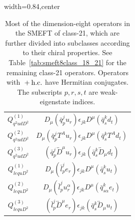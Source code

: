 \begin{table}[H]
\begin{center}
\begin{adjustbox}{width=0.84\textwidth,center}
\begin{minipage}[t]{5.7cm}
\begin{tabular}[t]{c|c}
$Q_{q^2udD^2}^{(1)}$  &  $D_\mu (\bar q_p^j u_r) \epsilon_{jk} D^\mu (\bar q_s^k d_t)$  \\
%
$Q_{q^2udD^2}^{(2)}$  &  $D_\mu (\bar q_p^j T^A u_r) \epsilon_{jk} D^\mu (\bar q_s^k T^A d_t)$   \\
%
$Q_{q^2udD^2}^{(3)}$  &  $(\bar q_p^j \overleftrightarrow{D}^\mu u_r) \epsilon_{jk} (\bar q_s^k \overleftrightarrow{D}_\mu  d_t)$   \\
%
$Q_{lequD^2}^{(1)}$  &  $D_\mu (\bar l_p^j e_r) \epsilon_{jk} D^\mu (\bar q_s^k u_t)$ \\
%
$Q_{lequD^2}^{(2)}$  &  $D_\mu (\bar l_p^j u_r^\alpha) \epsilon_{jk} D^\mu (\bar q_{s\alpha}^k e_t)$ \\
%
$Q_{lequD^2}^{(3)}$  &  $(\bar l_p^j  \overleftrightarrow{D}^\mu e_r) \epsilon_{jk} (\bar q_s^k \overleftrightarrow{D}_\mu u_t) $  
\end{tabular}
\end{minipage}
\end{adjustbox}
\end{center}
\caption{Most of the dimension-eight operators in the SMEFT of class-21, which are further divided into subclasses according to their chiral properties. 
See Table~\ref{tab:smeft8class_18_21} for the remaining class-21 operators.
Operators with ${}+\mathrm{h.c.}$ have Hermitian conjugates.
The subscripts $p, r, s, t$ are weak-eigenstate indices. }
\label{tab:smeft8class_21}
\end{table}
